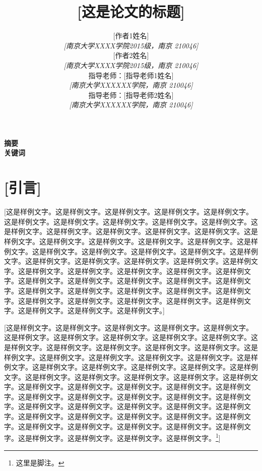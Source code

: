 \documentclass[a4paper,11pt,onecolumn,twoside]{article}
\title{\textbf{[这是论文的标题]}}
\author{
[作者1姓名]\\[2pt]
{\small \textit{[南京大学XXXX学院2015级，南京 210046]}}\\[2pt]
 [作者2姓名]\\[2pt]
 {\small \textit{[南京大学XXXX学院2015级，南京 210046]}}\\[6pt]
指导老师：[指导老师1姓名]\\[2pt]
{\small \textit{[南京大学XXXXXX学院，南京 210046]}}\\[2pt]
指导老师：[指导老师2姓名]\\[2pt]
{\small \textit{[南京大学XXXXXX学院，南京 210046]}}\\[2pt]
}
\date{}
\begin{document}
\maketitle
\thispagestyle{fancy}
\setlength{\textwidth}{15.50cm}
\vspace{-.8cm}
\begin{center}
\parbox{\textwidth}{
\textbf{摘要}  \\

\textbf{关键词}}
\end{center}

\setcounter{page}{1}

\setlength{\oddsidemargin}{-.5cm}  %
\setlength{\evensidemargin}{\oddsidemargin}
\setlength{\textwidth}{17.00cm}

\section*{[引言]}
[这是样例文字。这是样例文字。这是样例文字。这是样例文字。这是样例文字。这是样例文字。这是样例文字。这是样例文字。这是样例文字。这是样例文字。这是样例文字。这是样例文字。这是样例文字。这是样例文字。这是样例文字。这是样例文字。这是样例文字。这是样例文字。这是样例文字。这是样例文字。这是样例文字。这是样例文字。这是样例文字。这是样例文字。这是样例文字。这是样例文字。这是样例文字。这是样例文字。这是样例文字。这是样例文字。这是样例文字。这是样例文字。这是样例文字。这是样例文字。这是样例文字。这是样例文字。这是样例文字。这是样例文字。这是样例文字。这是样例文字。这是样例文字。这是样例文字。这是样例文字。这是样例文字。这是样例文字。这是样例文字。这是样例文字。这是样例文字。这是样例文字。这是样例文字。这是样例文字。这是样例文字。这是样例文字。这是样例文字。]

[这是样例文字。这是样例文字。这是样例文字。这是样例文字。这是样例文字。这是样例文字。这是样例文字。这是样例文字。这是样例文字。这是样例文字。这是样例文字。这是样例文字。这是样例文字。这是样例文字。这是样例文字。这是样例文字。这是样例文字。这是样例文字。这是样例文字。这是样例文字。这是样例文字。这是样例文字。这是样例文字。这是样例文字。这是样例文字。这是样例文字。这是样例文字。这是样例文字。这是样例文字。这是样例文字。这是样例文字。这是样例文字。这是样例文字。这是样例文字。这是样例文字。这是样例文字。这是样例文字。这是样例文字。这是样例文字。这是样例文字。这是样例文字。这是样例文字。这是样例文字。这是样例文字。这是样例文字。这是样例文字。这是样例文字。这是样例文字。这是样例文字。这是样例文字。这是样例文字。这是样例文字。这是样例文字。这是样例文字。这是样例文字。这是样例文字。这是样例文字。这是样例文字。这是样例文字。这是样例文字。\footnote{这里是脚注。}]
\end{document}

